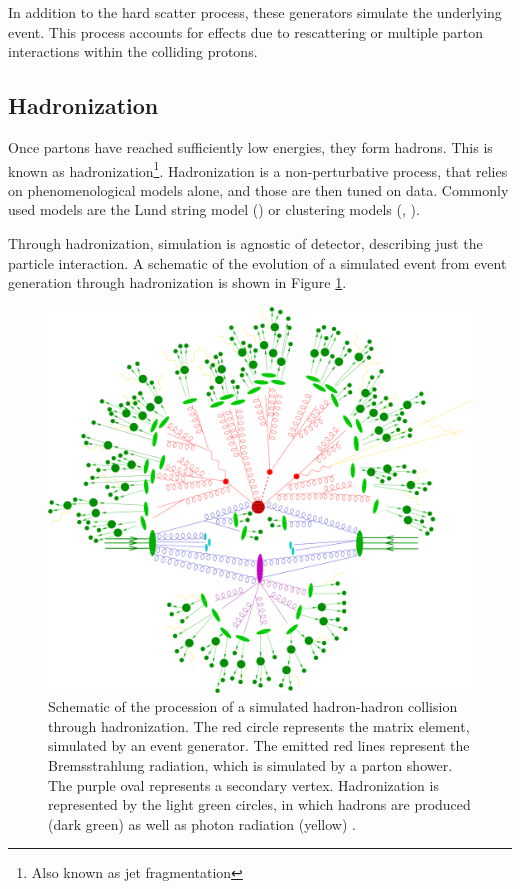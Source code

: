 In addition to the hard scatter process, these generators simulate the underlying event. This process accounts for effects due to rescattering or multiple parton interactions within the colliding protons.

\subsection{Hadronization} \label{ssec:hadronization}
Once partons have reached sufficiently low energies, they form hadrons. This is known as hadronization\footnote{Also known as jet fragmentation}. Hadronization is a non-perturbative process, that relies on phenomenological models alone, and those are then tuned on data. Commonly used models are the Lund string model \cite{lund-string} (\PYTHIA) or clustering models \cite{clustering-hadronization} (\HERWIG, \SHERPA).

Through hadronization, simulation is agnostic of detector, describing just the particle interaction. A schematic of the evolution of a simulated event from event generation through hadronization is shown in Figure \ref{fig:parton-shower-sketch}.

\begin{figure}[!thp]
    \centering
    \includegraphics[width=.70\textwidth]{chapters/chapter3_eventreco/images/parton-shower.png}

    \caption[Schematic of the procession of a simulated hadron-hadron collision.]{Schematic of the procession of a simulated hadron-hadron collision through hadronization. The red circle represents the matrix element, simulated by an event generator. The emitted red lines represent the Bremsstrahlung radiation, which is simulated by a parton shower. The purple oval represents a secondary vertex. Hadronization is represented by the light green circles, in which hadrons are produced (dark green) as well as photon radiation (yellow) \cite{parton-shower-sketch}.}
    \label{fig:parton-shower-sketch}
\end{figure}


